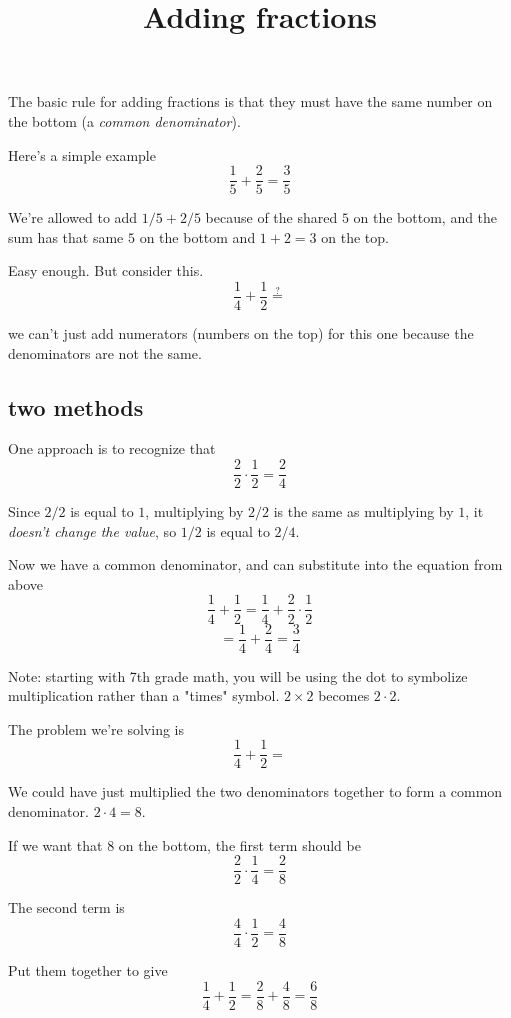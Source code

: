 \documentclass[11pt, oneside]{article}
\title{Adding fractions}
\date{}
\begin{document}
\maketitle
\Large


The basic rule for adding fractions is that they must have the same number on the bottom (a \emph{common denominator}).

Here's a simple example
\[ \frac{1}{5} + \frac{2}{5} = \frac{3}{5} \]

We're allowed to add $1/5 + 2/5$ because of the shared $5$ on the bottom, and the sum has that same $5$ on the bottom and $1 + 2 = 3$ on the top.

Easy enough.  But consider this.
\[ \frac{1}{4} + \frac{1}{2} \stackrel{?}{=} \]

we can't just add numerators (numbers on the top) for this one because the denominators are not the same.  

\subsection*{two methods}

One approach is to recognize that
\[ \frac{2}{2} \cdot \frac{1}{2} =  \frac{2}{4} \]

Since $2/2$ is equal to $1$, multiplying by $2/2$ is the same as multiplying by $1$, it \emph{doesn't change the value}, so $1/2$ is equal to $2/4$.  

Now we have a common denominator, and can substitute into the equation from above
\[ \frac{1}{4} + \frac{1}{2} = \frac{1}{4} +  \frac{2}{2} \cdot \frac{1}{2}  \]
\[ = \frac{1}{4} + \frac{2}{4} = \frac{3}{4} \]

Note:  starting with 7th grade math, you will be using the dot to symbolize multiplication rather than a "times" symbol.  $2 \times 2$ becomes $2 \cdot 2$.

The problem we're solving is
\[ \frac{1}{4} + \frac{1}{2} = \]

We could have just multiplied the two denominators together to form a common denominator.  $2 \cdot 4 = 8$.

 If we want that $8$ on the bottom, the first term should be
\[ \frac{2}{2} \cdot  \frac{1}{4} = \frac{2}{8} \]

The second term is
\[ \frac{4}{4} \cdot  \frac{1}{2}  = \frac{4}{8} \]

Put them together to give
\[   \frac{1}{4} + \frac{1}{2} = \frac{2}{8} + \frac{4}{8} = \frac{6}{8} \]
\end{document}
